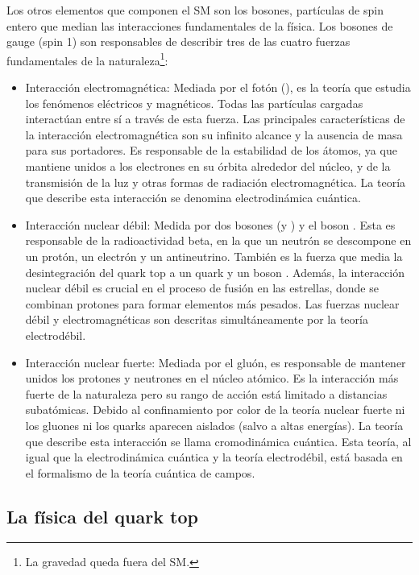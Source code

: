 Los otros elementos que componen el SM son los bosones, partículas de spin entero
que median las interacciones fundamentales de la física. Los bosones de gauge (spin 1)
son responsables de describir tres de las cuatro fuerzas fundamentales de la 
naturaleza\footnote{La gravedad queda fuera del SM.}: 
\begin{itemize}
	\item Interacción electromagnética: Mediada por el fotón (\Pgamma), es la teoría que estudia los fenómenos 
		eléctricos y magnéticos. Todas las partículas cargadas interactúan entre sí a través de esta fuerza.
		Las principales características de la interacción electromagnética son su infinito alcance 
		y la ausencia de masa para sus portadores. Es responsable de la estabilidad de los átomos, 
		ya que mantiene unidos a los electrones en su órbita alrededor del núcleo, y de la transmisión 
		de la luz y otras formas de radiación electromagnética.
		La teoría que describe esta interacción se denomina electrodinámica cuántica. 
	\item Interacción nuclear débil: Medida por dos bosones \PW (\PWplus y \PWminus) y el boson \PZ.
		Esta es responsable de la radioactividad beta, en la que un neutrón se descompone 
		en un protón, un electrón y un antineutrino. También es la fuerza que media la desintegración
		del quark top a un quark \Pbottom y un boson \PW. Además, la interacción nuclear débil es 
		crucial en el proceso de fusión en las estrellas, donde se combinan protones para formar 
		elementos más pesados.
		Las fuerzas nuclear débil y electromagnéticas son descritas simultáneamente por
		la teoría  electrodébil.
	\item Interacción nuclear fuerte: Mediada por el gluón, es responsable de mantener unidos los protones y 
		neutrones en el núcleo atómico. Es la interacción más fuerte de la naturaleza pero su rango de acción
		está limitado a distancias subatómicas.	
		Debido al confinamiento por color de la teoría nuclear fuerte ni los gluones ni los quarks aparecen 
		aislados (salvo a altas energías). 
		La teoría que describe esta interacción se llama cromodinámica cuántica. Esta teoría, al igual que la
		electrodinámica cuántica y la teoría electrodébil, está basada en el formalismo de la 
		teoría cuántica de campos.	
\end{itemize}


\subsection{La física del quark top}
